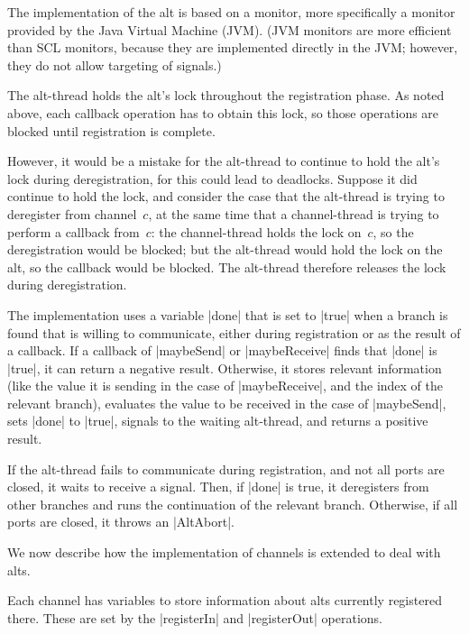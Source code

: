 
The implementation of the alt is based on a monitor, more specifically a
monitor provided by the Java Virtual Machine (JVM).  (JVM monitors are more
efficient than SCL monitors, because they are implemented directly in the JVM;
however, they do not allow targeting of signals.)  

The alt-thread holds the alt's lock throughout the registration phase.  As
noted above, each callback operation has to obtain this lock, so those
operations are blocked until registration is complete.

However, it would be a mistake for the alt-thread to continue to hold the
alt's lock during deregistration, for this could lead to deadlocks.  Suppose
it did continue to hold the lock, and consider the case that the alt-thread is
trying to deregister from channel~$c$, at the same time that a channel-thread
is trying to perform a callback from~$c$: the channel-thread holds the lock
on~$c$, so the deregistration would be blocked; but the alt-thread would hold
the lock on the alt, so the callback would be blocked.  The alt-thread
therefore releases the lock during deregistration.

The implementation uses a variable |done| that is set to |true| when a
branch is found that is willing to communicate, either during registration or
as the result of a callback.  If a callback of |maybeSend| or |maybeReceive|
finds that |done| is |true|, it can return a negative result.  Otherwise, it
stores relevant information (like the value it is sending in the case of
|maybeReceive|, and the index of the relevant branch), evaluates the value to
be received in the case of |maybeSend|, sets |done| to |true|, signals to the
waiting alt-thread, and returns a positive result.

If the alt-thread fails to communicate during registration, and not all
ports are closed, it waits to receive a signal.  Then, if |done| is true, it
deregisters from other branches and runs the continuation of the relevant
branch.  Otherwise, if all ports are closed, it throws an |AltAbort|. 


We now describe how the implementation of channels is extended to deal with
alts.

Each channel has variables to store information about alts currently
registered there.  These are set by the |registerIn| and |registerOut|
operations. 

